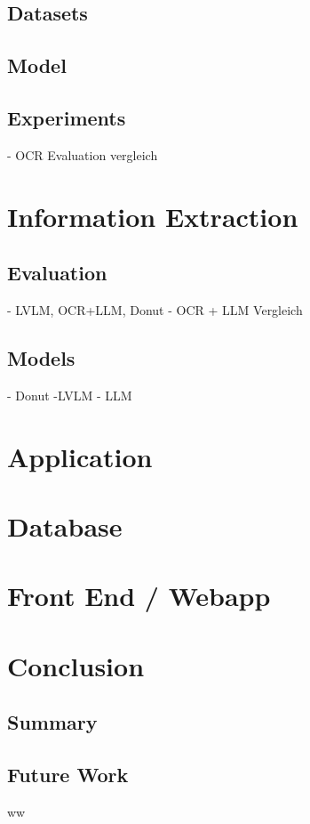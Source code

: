 \documentclass[11pt]{article}
\begin{document}
    \subsection{Datasets}
    \subsection{Model}
    \subsection{Experiments}
    - OCR Evaluation vergleich

\section{Information Extraction}
    \subsection{Evaluation}
    - LVLM, OCR+LLM, Donut
    - OCR + LLM Vergleich
    \subsection{Models}
        - Donut
        -LVLM
        - LLM

\section{Application}
    \section{Database}
    \section{Front End / Webapp}

\section{Conclusion}
    \subsection{Summary}
    \subsection{Future Work}
    ww

%

\end{document}
